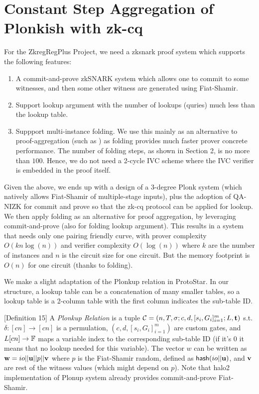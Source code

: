 \section{Constant Step Aggregation of Plonkish with zk-cq}
  For the ZkregRegPlus Project, we need a zksnark proof system
which supports the following features:
\begin{enumerate}
	\item A commit-and-prove zkSNARK system which allows one
	to commit to some witnesses, and then some other witness
	are generated using Fiat-Shamir.
	\item Support lookup argument with the number of lookups (quries)
	much less than the lookup table.
	\item Suppport multi-instance folding. We use this mainly as
	an alternative to proof-aggregation (such as \cite{Bunz21,SNARKPack})
	as folding provides much faster prover concrete performance.
	The number of folding steps, as shown in Section 2, is no more
	than $100$. Hence, we do not need a 2-cycle IVC scheme where
	the IVC verifier is embedded in the proof itself.
\end{enumerate}

Given the above, we ends up with a design of a $3$-degree
Plonk system \cite{GWC19} (which natively allows Fiat-Shamir of
multiple-stage inputs), plus the adoption of QA-NIZK for commit
and prove so that the zk-cq protocol can be applied for lookup.
We then apply folding as an alternative for proof aggregation,
by leveraging commit-and-prove (also for folding lookup argument).
This results in a system that needs only one pairing friendly curve,
with prover complexity $O(kn\log(n))$ and verifier
complexity $O(\log(n))$ where $k$ are the number of instances
and $n$ is the circuit size for one circuit. But the memory
footprint is $O(n)$ for one circuit (thanks to folding).

We make a slight adaptation of the Plonkup relation in
ProtoStar. In our structure, a lookup table can be a concatenation
of many smaller tables, so a lookup table is a 2-column table
with the first column indicates the sub-table ID.
\begin{definition} \cite{ProtoStar}[Definition 15] A {\em Plonkup Relation}
is a tuple $\mathcal C = (n, T, \sigma; c, d, [s_i, G_i]_{i=1}^m; L, {{\mathbf {t}}})$
s.t. $\delta: [cn] \rightarrow [cn]$ is a permulation,
$(c,d,[s_i, G_i]_{i=1}^m)$ are custom gates, and $L [cn] \rightarrow \mathbb{F}$
maps a variable index to the corresponding sub-table ID (if it's $0$
it means that no lookup needed for this variable). The vector $w$
can be written as ${{\mathbf {w}}} = io || {{\mathbf {u}}} || p || {{\mathbf {v}}}$
where $p$ is the Fiat-Shamir random, defined as
$\mathsf{hash}(io || {{\mathbf {u}}})$, and ${{\mathbf {v}}}$ are rest of the
witness values (which might depend on $p$). Note that
halo2 implementation of Plonup system already provides commit-and-prove
Fiat-Shamir.
\end{definition}

